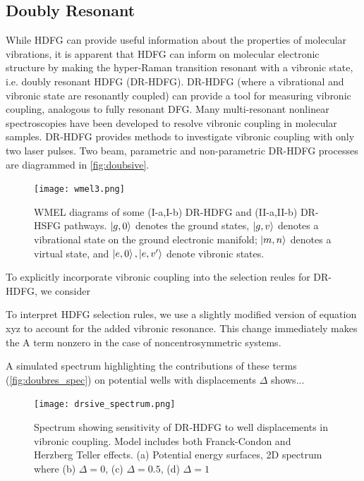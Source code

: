\documentclass[aip, jcp, reprint, onecolumn]{revtex4-2}
\begin{document}
\subsection{Doubly Resonant}
While HDFG can provide useful information about the properties of molecular vibrations, it is apparent that HDFG can inform on molecular electronic structure by making the hyper-Raman transition resonant with a vibronic state, i.e. doubly resonant HDFG (DR-HDFG).
DR-HDFG (where a vibrational and vibronic state are resonantly coupled) can provide a tool for measuring vibronic coupling, analogous to fully resonant DFG. \cite{Dick83_1, Shen94}
Many multi-resonant nonlinear spectroscopies have been developed to resolve vibronic coupling in molecular samples. \cite{Carlson1990, Gaynor2017, RN276}
DR-HDFG provides methods to investigate vibronic coupling with only two laser pulses.
Two beam, parametric and non-parametric DR-HDFG processes are diagrammed in \autoref{fig:doubsive}.

\begin{figure}[!htbp]
	\centering
	\texttt{[image: wmel3.png]}
	\caption{WMEL diagrams of some (I-a,I-b) DR-HDFG and (II-a,II-b) DR-HSFG pathways. $\ket{g,0}$ denotes the ground states, $\ket{g,v}$ denotes a vibrational state on the ground electronic manifold; $\ket{m,n}$ denotes a virtual state, and $\ket{e,0}, \ket{e,v'}$ denote vibronic states.}
	\label{fig:doubsive}
\end{figure}

To explicitly incorporate vibronic coupling into the selection reules for DR-HDFG, we consider 

To interpret HDFG selection rules, we use a slightly modified version of equation xyz to account for the added vibronic resonance. 
This change immediately makes the A term nonzero in the case of noncentrosymmetric systems.

A simulated spectrum highlighting the contributions of these terms (\autoref{fig:doubres_spec}) on potential wells with displacements $\Delta$ shows... 
\begin{figure}[!htbp]
	\centering
	\texttt{[image: drsive\_spectrum.png]}
	\caption{Spectrum showing sensitivity of DR-HDFG to well displacements in vibronic coupling.
		Model includes both Franck-Condon and Herzberg Teller effects.
		(a) Potential energy surfaces, 2D spectrum where (b) $\Delta = 0$, (c) $\Delta = 0.5$, (d) $\Delta = 1$}
	\label{fig:doubres_spec}
\end{figure}
\end{document}
